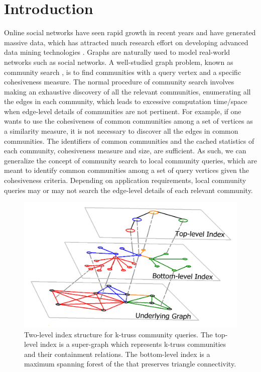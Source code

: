 \section{Introduction}
\label{introduction}

Online social networks have seen rapid growth in recent years and have generated massive data, which has attracted much research effort on developing advanced data mining technologies \cite{cohen2008trusses, liu2018connect, wang2017big, wu2018social, lu2017decentralized}. Graphs are naturally used to model real-world networks such as social networks. A well-studied graph problem, known as community search \cite{huang2014querying, akbas2017truss, sozio2010community, cui2014local}, is to find communities with a query vertex and a specific cohesiveness measure. 
The normal procedure of community search involves making an exhaustive discovery of all the relevant communities, \ie enumerating all the edges in each community, which leads to excessive computation time/space when edge-level details of communities are not pertinent. %
For example, if one wants to use the cohesiveness of common communities among a set of vertices as a similarity measure, it is not necessary to discover all the edges in common communities. The identifiers of common communities and the cached statistics of each community, \eg cohesiveness measure and size, are sufficient. As such, we can generalize the concept of community search to local community queries, which are meant to identify common communities among a set of query vertices given the cohesiveness criteria. Depending on application requirements, local community queries may or may not search the edge-level details of each relevant community. 

\begin{figure}[ht]
    \centering
    \includegraphics[width=0.9\linewidth]{./figures/illustration_main.png}
		\vspace{-0.2cm}
    \caption{Two-level index structure for k-truss community queries. The top-level index is a super-graph which represents k-truss communities and their containment relations. The bottom-level index is a maximum spanning forest of the\inducedgraph{} that preserves triangle connectivity.}
    \label{fig:illustration_main}
		\vspace{-0.5cm}
\end{figure}

